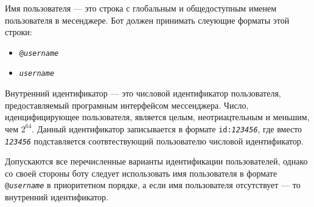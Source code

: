     Имя пользователя --- это строка с глобальным и общедоступным именем пользователя в месенджере.
    Бот должен принимать слеующие форматы этой строки:
    \begin{itemize}
        \item
            \texttt{@\textit{username}}
        \item
            \texttt{\textit{username}}
    \end{itemize}
    
    Внутренний идентификатор --- это числовой идентификатор пользователя, предоставляемый
    програмным интерфейсом мессенджера. Число, иденцифицирующее пользователя, является целым,
    неотриацтельным и меньшим, чем \(2^{64}\). Данный идентификатор записывается в формате
    \texttt{id:\textit{123456}}, где вместо \texttt{\textit{123456}} подставляется соотвтествующий
    пользователю числовой идентификатор.

    Допускаются все перечисленные варианты идентификации пользователей, однако со своей стороны боту
    следует использовать имя пользователя в формате \texttt{@\textit{username}} в приоритетном порядке,
    а если имя пользователя отсутствует --- то внутренний идентификатор.
